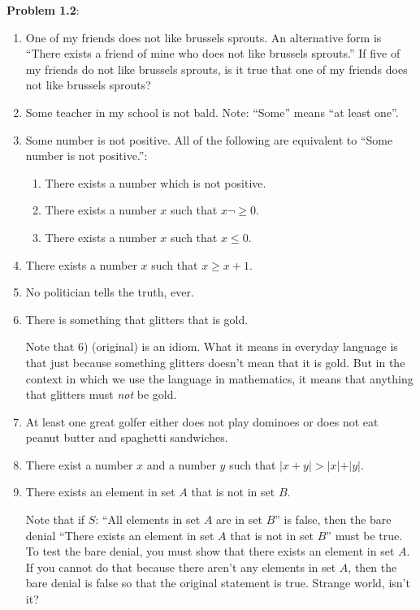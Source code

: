 \documentclass[english]{book}
\begin{document}
\textbf{Problem 1.2}:
\begin{enumerate}[\hspace{1cm}1)]
  \item One of my friends does not like brussels sprouts. An alternative form is ``There exists a friend of mine who does not like brussels sprouts.'' If five of my friends do not like brussels sprouts, is it true that one of my friends does not like brussels sprouts?
  \item Some teacher in my school is not bald. Note: ``Some'' means ``at least one''.
  \item Some number is not positive. All of the following are equivalent to ``Some number is not positive.'':
    \begin{enumerate}[\hspace{1cm}(a)]
      \item There exists a number which is not positive.
      \item There exists a number $x$ such that $x \neg \geq 0$.
      \item There exists a number $x$ such that $x \leq 0$.
    \end{enumerate}
  \item There exists a number $x$ such that $x \geq x+1$.
  \item No politician tells the truth, ever.
  \item There is something that glitters that is gold.

        Note that 6) (original) is an idiom. What it means in everyday language is that just because something glitters doesn't mean that it is gold. But in the context in which we use the language in mathematics, it means that anything that glitters must \emph{not} be gold.

  \item At least one great golfer either does not play dominoes or does not eat peanut butter and spaghetti sandwiches.
  \item There exist a number $x$ and a number $y$ such that $\vert x+y \vert > \vert x \vert + \vert y \vert$.
  \item There exists an element in set $A$ that is not in set $B$.

        Note that if $S$: ``All elements in set $A$ are in set $B$'' is false, then the bare denial ``There exists an element in set $A$ that is not in set $B$'' must be true. To test the bare denial, you must show that there exists an element in set $A$. If you cannot do that because there aren't any elements in set $A$, then the bare denial is false so that the original statement is true. Strange world, isn't it?
\end{enumerate}
\end{document}
